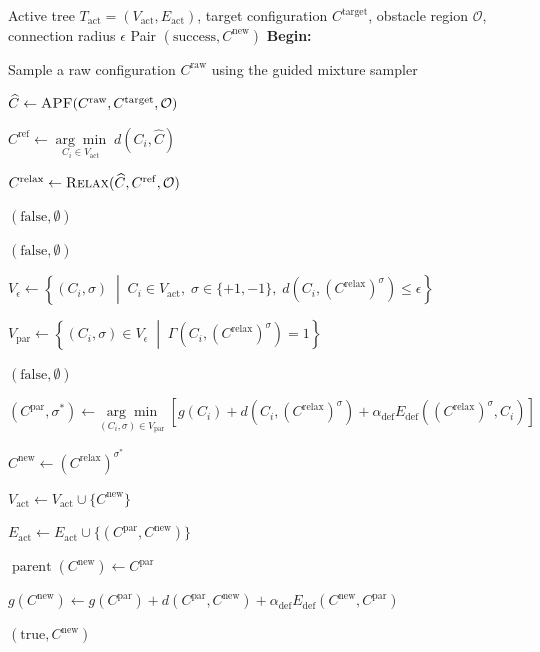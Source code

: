 \documentclass{pas}
\begin{document}
\begin{algorithm}[t]
\small
\caption{Tree Expansion}
\label{alg:gcr_expand}
\begin{algorithmic}[1]
\Require Active tree \(T_{\mathrm{act}}=(V_{\mathrm{act}},E_{\mathrm{act}})\),
target configuration \(C^{\mathrm{target}}\), obstacle region \(\mathcal{O}\),
connection radius \(\epsilon\)
\Ensure Pair \((\mathrm{success},C^{\mathrm{new}})\)
\Statex \textbf{Begin:}

\State Sample a raw configuration \(C^{\mathrm{raw}}\) using the guided mixture sampler

\State \(\widehat{C}\gets
\Call{APF}{C^{\mathrm{raw}},C^{\mathrm{target}},\mathcal{O}}\)

\State \(C^{\mathrm{ref}}\gets
\underset{C_i\in V_{\mathrm{act}}}{\arg\min}\;d(C_i,\widehat{C})\)

\State \(C^{\mathrm{relax}}\gets
\Call{Relax}{\widehat{C},C^{\mathrm{ref}},\mathcal{O}}\)

    \State \Return \((\mathrm{false},\emptyset)\)
\EndIf

    \State \Return \((\mathrm{false},\emptyset)\)
\EndIf

\State \(V_{\epsilon}\gets
\left\{
(C_i,\sigma)
\;\middle|\;
C_i\in V_{\mathrm{act}},\;
\sigma\in\{+1,-1\},\;
d\left(C_i,\left(C^{\mathrm{relax}}\right)^{\sigma}\right)\leq\epsilon
\right\}\)

\State \(V_{\mathrm{par}}\gets
\left\{
(C_i,\sigma)\in V_{\epsilon}
\;\middle|\;
\Gamma\left(C_i,\left(C^{\mathrm{relax}}\right)^{\sigma}\right)=1
\right\}\)

    \State \Return \((\mathrm{false},\emptyset)\)
\EndIf

\State \((C^{\mathrm{par}},\sigma^{\ast})\gets
\underset{(C_i,\sigma)\in V_{\mathrm{par}}}{\arg\min}\;
\left[
g(C_i)+d\left(C_i,\left(C^{\mathrm{relax}}\right)^{\sigma}\right)
+\alpha_{\mathrm{def}}
E_{\mathrm{def}}\left(\left(C^{\mathrm{relax}}\right)^{\sigma},C_i\right)
\right]\)

\State \(C^{\mathrm{new}}\gets
\left(C^{\mathrm{relax}}\right)^{\sigma^{\ast}}\)

\State \(V_{\mathrm{act}}\gets V_{\mathrm{act}}\cup\{C^{\mathrm{new}}\}\)

\State \(E_{\mathrm{act}}\gets E_{\mathrm{act}}\cup
\{(C^{\mathrm{par}},C^{\mathrm{new}})\}\)

\State \(\operatorname{parent}(C^{\mathrm{new}})\gets C^{\mathrm{par}}\)

\State \(g(C^{\mathrm{new}})\gets
g(C^{\mathrm{par}})
+d(C^{\mathrm{par}},C^{\mathrm{new}})
+\alpha_{\mathrm{def}}E_{\mathrm{def}}(C^{\mathrm{new}},C^{\mathrm{par}})\)

\State \Return \((\mathrm{true},C^{\mathrm{new}})\)

\end{algorithmic}
\end{algorithm}
\end{document}
